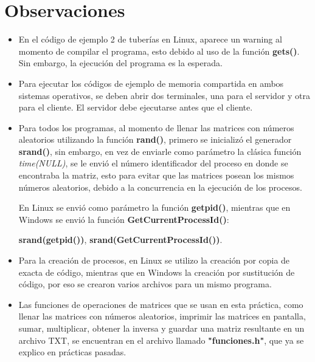 \documentclass[12pt]{article}
\begin{document}
  
  \section{Observaciones}
  \begin{itemize}
          \item[\Checkmark] En el código de ejemplo 2 de tuberías en Linux, aparece un warning al momento de compilar el programa, esto debido al uso de la función \textbf{gets()}. Sin embargo, la ejecución del programa es la esperada.
          
          \item[\Checkmark] Para ejecutar los códigos de ejemplo de memoria compartida en ambos sistemas operativos, se deben abrir dos terminales, una para el servidor y otra para el cliente. El servidor debe ejecutarse antes que el cliente.
          
          \item[\Checkmark] Para todos los programas, al momento de llenar las matrices con números aleatorios utilizando la función \textbf{rand()}, primero se inicializó el generador \textbf{srand()}, sin embargo, en vez de enviarle como parámetro la clásica función \textit{time(NULL)}, se le envió el número identificador del proceso en donde se encontraba la matriz, esto para evitar que las matrices posean los mismos números aleatorios, debido a la concurrencia en la ejecución de los procesos.
          
          En Linux se envió como parámetro la función \textbf{getpid()}, mientras que en Windows se envió la función \textbf{GetCurrentProcessId()}:
          
          \textbf{srand(getpid())}, \textbf{srand(GetCurrentProcessId())}.
          
           \item[\Checkmark] Para la creación de procesos, en Linux se utilizo la creación por copia de exacta de código, mientras que en Windows la creación por sustitución de código, por eso se crearon varios archivos para un mismo programa.
           
           \item[\Checkmark] Las funciones de operaciones de matrices que se usan en esta práctica, como llenar las matrices con números aleatorios, imprimir las matrices en pantalla, sumar, multiplicar, obtener la inversa y guardar una matriz resultante en un archivo TXT, se encuentran en el archivo llamado \textbf{"funciones.h"}, que ya se explico en prácticas pasadas.
           

\end{itemize}
\end{document}
